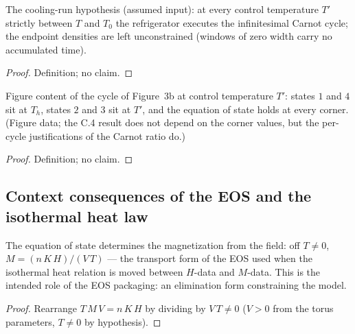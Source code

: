 \begin{definition}
\label{def:IPhO2026Problems_problem_IPhO_2026_3_C_4:IsCoolingRun}
The cooling-run hypothesis (assumed input): at every control
temperature $T'$ strictly between $T$ and $T_0$ the refrigerator
executes the infinitesimal Carnot cycle; the endpoint densities are
left unconstrained (windows of zero width carry no accumulated time).
\end{definition}
\begin{proof}
Definition; no claim.
\end{proof}

\begin{definition}
\label{def:IPhO2026Problems_problem_IPhO_2026_3_C_4:Figure3bCorners}
Figure content of the cycle of Figure~3b at control temperature $T'$:
states $1$ and $4$ sit at $T_h$, states $2$ and $3$ sit at $T'$, and
the equation of state holds at every corner. (Figure data; the C.4
result does not depend on the corner values, but the per-cycle
justifications of the Carnot ratio do.)
\end{definition}
\begin{proof}
Definition; no claim.
\end{proof}

\subsection*{Context consequences of the EOS and the isothermal heat law}

\begin{lemma}
\label{lem:IPhO2026Problems_problem_IPhO_2026_3_C_4:magnetization_of_eos}
The equation of state determines the magnetization from the field:
off $T \neq 0$, $M = (n\,K\,H)/(V\,T)$ --- the transport form of the
EOS used when the isothermal heat relation is moved between $H$-data
and $M$-data. This is the intended role of the EOS packaging: an
elimination form constraining the model.
\end{lemma}
\begin{proof}
Rearrange $T\,M\,V = n\,K\,H$ by dividing by $V\,T \neq 0$
($V > 0$ from the torus parameters, $T \neq 0$ by hypothesis).
\end{proof}

